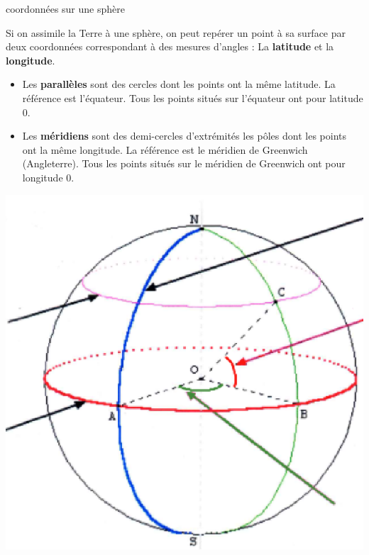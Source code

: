 \documentclass[openany]{book}
\begin{document}
\begin{DefT}{coordonnées sur une sphère}
\begin{minipage}{0.5\linewidth}

Si on assimile la Terre à une sphère, on peut repérer un point à sa surface par deux coordonnées correspondant à des mesures d'angles : La \textbf{latitude} et la \textbf{longitude}.
\begin{itemize}
\item Les \textbf{parallèles} sont des cercles dont les points ont la même latitude. La référence est l'équateur. Tous les points situés sur l'équateur ont pour latitude 0\deg .
\item Les \textbf{méridiens} sont des demi-cercles d'extrémités les pôles dont les points ont la même longitude. La référence est le méridien de Greenwich (Angleterre). Tous les points situés sur le méridien de Greenwich ont pour longitude 0\deg .
\end{itemize}
\end{minipage}
\begin{minipage}{0.5\linewidth}
\begin{center}
 \includegraphics[scale=0.5]{lat_long_sphere.eps} 
\end{center}
\end{minipage}

\end{DefT}
 
\end{document}
